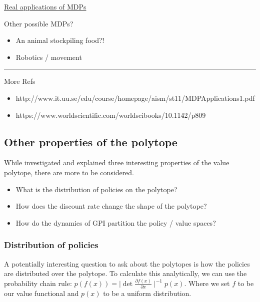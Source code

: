 \href{http://www.it.uu.se/edu/course/homepage/aism/st11/MDPApplications1.pdf}{Real
applications of MDPs}

Other possible MDPs?

\begin{itemize}
\tightlist
\item
  An animal stockpiling food?!
\item
  Robotics / movement
\end{itemize}

\begin{center}\rule{0.5\linewidth}{\linethickness}\end{center}

More Refs

\begin{itemize}
\tightlist
\item
  http://www.it.uu.se/edu/course/homepage/aism/st11/MDPApplications1.pdf
\item
  https://www.worldscientific.com/worldscibooks/10.1142/p809
\end{itemize}


\subsection{Other properties of the polytope}

While \cite{Dadashi2018} investigated and explained three interesting properties
of the value polytope, there are more to be considered.

\begin{itemize}
\tightlist
\item
  What is the distribution of policies on the polytope?
\item
  How does the discount rate change the shape of the polytope?
\item
  How do the dynamics of GPI partition the policy / value spaces?
\end{itemize}

\subsubsection{Distribution of policies}

A potentially interesting question to ask about the polytopes is how the
policies are distributed over the polytope. To calculate this
analytically, we can use the probability chain rule:
\(p(f(x)) = \mid \det\frac{\partial f(x)}{\partial x}\mid^{-1}p(x)\).
Where we set \(f\) to be our value functional and \(p(x)\) to be a
uniform distribution.


